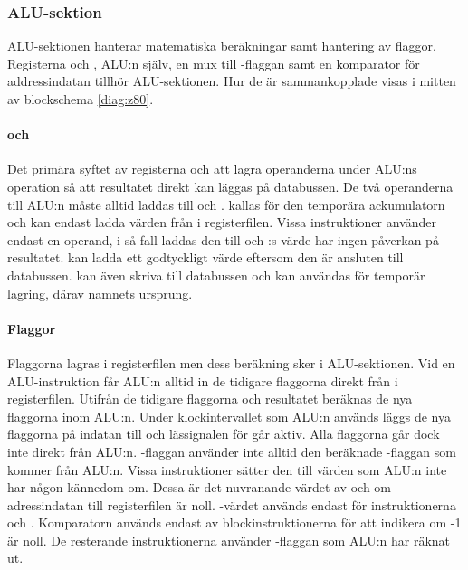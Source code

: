 \documentclass[main.tex]{subfiles}
\begin{document}
\newpage
\subsubsection{ALU-sektion}
ALU-sektionen hanterar matematiska beräkningar samt hantering av flaggor.
Registerna  och , ALU:n själv, en mux till -flaggan
samt en komparator för addressindatan tillhör ALU-sektionen. Hur de är
sammankopplade visas i mitten av blockschema \ref{diag:z80}.

\paragraph{ och }
Det primära syftet av registerna  och  att lagra
operanderna under ALU:ns operation så att resultatet direkt kan läggas på
databussen. De två operanderna till ALU:n måste alltid laddas till 
och .  kallas för den temporära ackumulatorn och kan endast
ladda värden från  i registerfilen. Vissa instruktioner använder endast
en operand, i så fall laddas den till  och :s värde har
ingen påverkan på resultatet.  kan ladda ett godtyckligt värde
eftersom den är ansluten till databussen.  kan även skriva till
databussen och kan användas för temporär lagring, därav namnets ursprung.

\paragraph{Flaggor}
Flaggorna lagras i registerfilen men dess beräkning sker i ALU-sektionen. Vid
en ALU-instruktion får ALU:n alltid in de tidigare flaggorna direkt från
 i registerfilen. Utifrån de tidigare flaggorna och resultatet beräknas
de nya flaggorna inom ALU:n. Under klockintervallet som ALU:n används läggs de
nya flaggorna på indatan till  och lässignalen för  går aktiv.
Alla flaggorna går dock inte direkt från ALU:n. -flaggan använder inte
alltid den beräknade -flaggan som kommer från ALU:n. Vissa
instruktioner sätter den till värden som ALU:n inte har någon kännedom om.
Dessa är det nuvranande värdet av  och om adressindatan till
registerfilen är noll. -värdet används endast för instruktionerna
 och . Komparatorn används endast av
blockinstruktionerna för att indikera om -1 är noll. De resterande
instruktionerna använder -flaggan som ALU:n har räknat ut.
\end{document}
